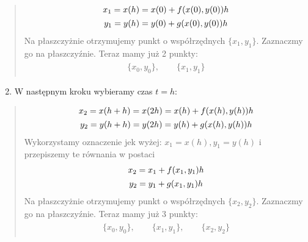 \documentclass[a4paper,12pt,polish]{sphinxmanual}
\begin{document}
\begin{quote}
\label{ch1/chI021:equation-eqn39}\begin{gather}
\begin{split}x_1 =x(h) = x(0) + f(x(0), y(0)) h\end{split}\label{ch1/chI021-eqn39}\\\begin{split}y_1 = y(h) = y(0) + g(x(0), y(0)) h\end{split}\notag
\end{gather}
Na płaszczyżnie otrzymujemy punkt o współrzędnych $\{x_1, y_1\}$. Zaznaczmy go na płaszczyźnie. Teraz mamy już 2 punkty:
\label{ch1/chI021:equation-eqn41}\begin{gather}
\begin{split}\{x_0, y_0\}, \quad \quad \{x_1, y_1\}\end{split}\label{ch1/chI021-eqn41}
\end{gather}\end{quote}
\begin{enumerate}
\setcounter{enumi}{1}
\item {} 
W następnym kroku wybieramy czas $t=h$:

\end{enumerate}
\begin{quote}
\label{ch1/chI021:equation-eqn42}\begin{gather}
\begin{split}x_2 =x(h+h) = x(2h) =  x(h) + f(x(h), y(h)) h\end{split}\label{ch1/chI021-eqn42}\\\begin{split}y_2 = y(h+h) = y(2h) =  y(h) + g(x(h), y(h)) h\end{split}\notag
\end{gather}
Wykorzystamy oznaczenie jek wyżej: $x_1 =  x(h),  y_1 = y(h)$ i przepiszemy te równania w postaci
\label{ch1/chI021:equation-eqn43}\begin{gather}
\begin{split}x_2 =  x_1 + f(x_1, y_1) h\end{split}\label{ch1/chI021-eqn43}\\\begin{split}y_2 =  y_1 + g(x_1, y_1) h\end{split}\notag
\end{gather}
Na płaszczyżnie otrzymujemy punkt o współrzędnych $\{x_2, y_2\}$. Zaznaczmy go na płaszczyźnie. Teraz mamy już 3 punkty:
\label{ch1/chI021:equation-eqn45}\begin{gather}
\begin{split}\{x_0, y_0\}, \quad \quad \{x_1, y_1\},  \quad \quad \{x_2, y_2\}\end{split}\label{ch1/chI021-eqn45}
\end{gather}\end{quote}
\end{document}
